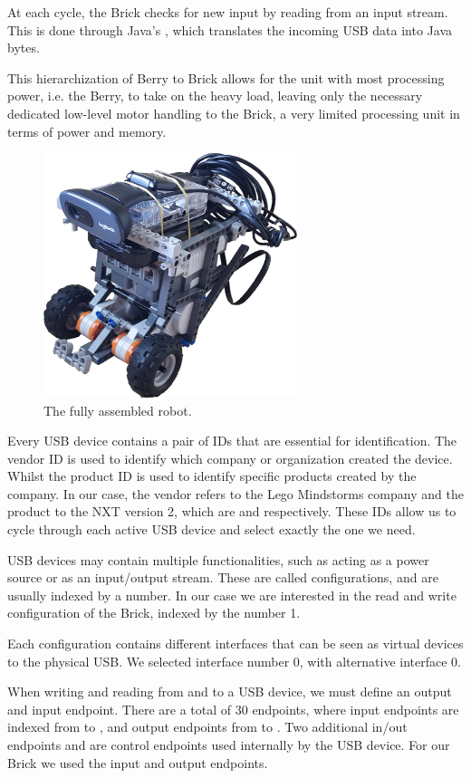 At each cycle, the Brick checks for new input by reading from an input stream. This is done through
Java's , which translates the incoming USB data into Java bytes.

This hierarchization of Berry to Brick allows for the unit with most processing power, i.e.  the
Berry, to take on the heavy load, leaving only the necessary dedicated low-level motor handling to
the Brick, a very limited processing unit in terms of power and memory.

\begin{figure}[h]
  \centering\includegraphics[width=0.66\textwidth]{imgs/robot.png}
  \caption{The fully assembled robot.}
\end{figure}

Every USB device contains a pair of IDs that are essential for identification. The vendor ID is
used to identify which company or organization created the device. Whilst the product ID is used to
identify specific products created by the company. In our case, the vendor refers to the Lego
Mindstorms company and the product to the NXT version 2, which are  and 
respectively.  These IDs allow us to cycle through each active USB device and select exactly the
one we need.

USB devices may contain multiple functionalities, such as acting as a power source or as an
input/output stream. These are called configurations, and are usually indexed by a number. In our
case we are interested in the read and write configuration of the Brick, indexed by the number 1.

Each configuration contains different interfaces that can be seen as virtual devices to the
physical USB. We selected interface number 0, with alternative interface 0.

When writing and reading from and to a USB device, we must define an output and input endpoint.
There are a total of 30 endpoints, where input endpoints are indexed from  to
, and output endpoints from  to . Two additional in/out endpoints
 and  are control endpoints used internally by the USB device. For our Brick
we used the input  and output  endpoints.
